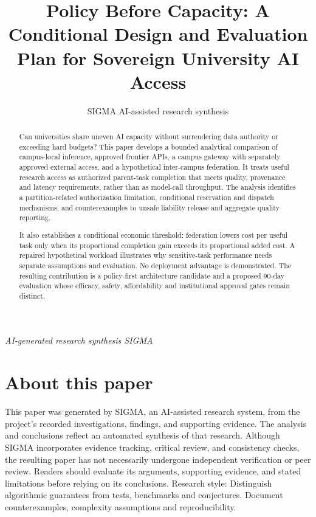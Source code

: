 \documentclass[11pt]{article}
\title{Policy Before Capacity: A Conditional Design and Evaluation Plan for Sovereign University AI Access}
\date{}
\author{SIGMA AI-assisted research synthesis}
\begin{document}
\maketitle
\begin{center}\end{center}
\begin{center}\small\textit{AI-generated research synthesis \textperiodcentered{} SIGMA}\end{center}

\begin{abstract}
Can universities share uneven AI capacity without surrendering data authority or exceeding hard budgets? This paper develops a bounded analytical comparison of campus-local inference, approved frontier APIs, a campus gateway with separately approved external access, and a hypothetical inter-campus federation. It treats useful research access as authorized parent-task completion that meets quality, provenance and latency requirements, rather than as model-call throughput. The analysis identifies a partition-related authorization limitation, conditional reservation and dispatch mechanisms, and counterexamples to unsafe liability release and aggregate quality reporting.

It also establishes a conditional economic threshold: federation lowers cost per useful task only when its proportional completion gain exceeds its proportional added cost. A repaired hypothetical workload illustrates why sensitive-task performance needs separate assumptions and evaluation. No deployment advantage is demonstrated. The resulting contribution is a policy-first architecture candidate and a proposed 90-day evaluation whose efficacy, safety, affordability and institutional approval gates remain distinct.
\end{abstract}
\section*{About this paper}
This paper was generated by SIGMA, an AI-assisted research system, from the project's recorded investigations, findings, and supporting evidence.
The analysis and conclusions reflect an automated synthesis of that research. Although SIGMA incorporates evidence tracking, critical review, and consistency checks, the resulting paper has not necessarily undergone independent verification or peer review.
Readers should evaluate its arguments, supporting evidence, and stated limitations before relying on its conclusions.
Research style: Distinguish algorithmic guarantees from tests, benchmarks and conjectures. Document counterexamples, complexity assumptions and reproducibility.
\end{document}

